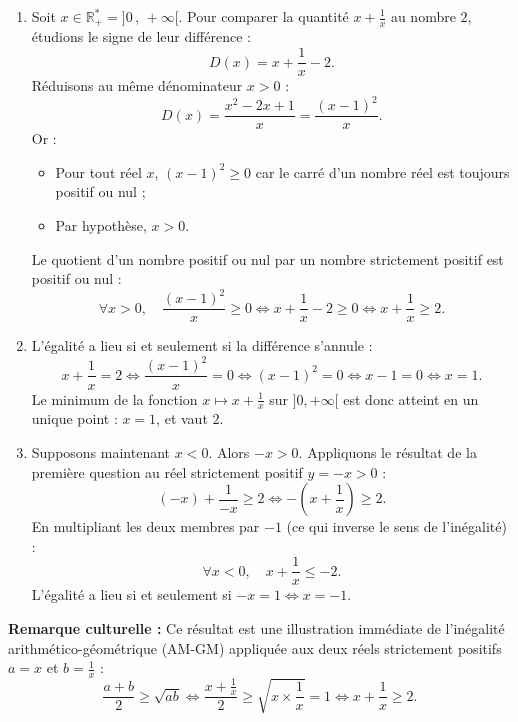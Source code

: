 \documentclass[11pt,a4paper]{article}
\newcommand{\R}{\mathbb{R}}
\begin{document}
\begin{correctionbox}
\begin{enumerate}
    \item Soit $x \in \R_+^* = ]0\,,\, +\infty[$.
    Pour comparer la quantité $x + \frac{1}{x}$ au nombre $2$, étudions le signe de leur différence :
    \[
    D(x) = x + \frac{1}{x} - 2.
    \]
    Réduisons au même dénominateur $x > 0$ :
    \[
    D(x) = \frac{x^2 - 2x + 1}{x} = \frac{(x - 1)^2}{x}.
    \]
    Or :
    \begin{itemize}
        \item Pour tout réel $x$, $(x - 1)^2 \ge 0$ car le carré d'un nombre réel est toujours positif ou nul ;
        \item Par hypothèse, $x > 0$.
    \end{itemize}
    Le quotient d'un nombre positif ou nul par un nombre strictement positif est positif ou nul :
    \[
    \forall x > 0, \quad \frac{(x-1)^2}{x} \ge 0 \iff x + \frac{1}{x} - 2 \ge 0 \iff x + \frac{1}{x} \ge 2.
    \]

    \item L'égalité a lieu si et seulement si la différence s'annule :
    \[
    x + \frac{1}{x} = 2 \iff \frac{(x-1)^2}{x} = 0 \iff (x-1)^2 = 0 \iff x - 1 = 0 \iff x = 1.
    \]
    Le minimum de la fonction $x \mapsto x + \frac{1}{x}$ sur $]0, +\infty[$ est donc atteint en un unique point : $x = 1$, et vaut $2$.

    \item Supposons maintenant $x < 0$. Alors $-x > 0$.
    Appliquons le résultat de la première question au réel strictement positif $y = -x > 0$ :
    \[
    (-x) + \frac{1}{-x} \ge 2 \iff -\left(x + \frac{1}{x}\right) \ge 2.
    \]
    En multipliant les deux membres par $-1$ (ce qui inverse le sens de l'inégalité) :
    \[
    \forall x < 0, \quad x + \frac{1}{x} \le -2.
    \]
    L'égalité a lieu si et seulement si $-x = 1 \iff x = -1$.
\end{enumerate}
\textbf{Remarque culturelle :} Ce résultat est une illustration immédiate de l'inégalité arithmético-géométrique (AM-GM) appliquée aux deux réels strictement positifs $a = x$ et $b = \frac{1}{x}$ :
\[
\frac{a + b}{2} \ge \sqrt{ab} \iff \frac{x + \frac{1}{x}}{2} \ge \sqrt{x \times \frac{1}{x}} = 1 \iff x + \frac{1}{x} \ge 2.
\]
\end{correctionbox}

\end{document}
